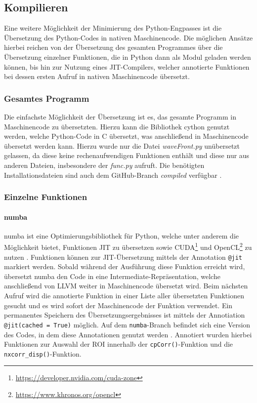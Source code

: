 \subsection{Kompilieren}

Eine weitere Möglichkeit der Minimierung des Python-Engpasses ist die Übersetzung des Python-Codes in nativen Maschinencode. Die möglichen Ansätze hierbei reichen von der Übersetzung des gesamten Programmes über die Übersetzung einzelner Funktionen, die in Python dann als Modul geladen werden können, bis hin zur Nutzung eines \gls{JIT}-Compilers, welcher annotierte Funktionen bei dessen ersten Aufruf in nativen Maschinencode übersetzt. 

\subsubsection{Gesamtes Programm}

Die einfachste Möglichkeit der Übersetzung ist es, das gesamte Programm in Maschinencode zu übersetzten. Hierzu kann die Bibliothek cython \cite{BBD+17} genutzt werden, welche Python-Code in C übersetzt, was anschließend in Maschinencode übersetzt werden kann. Hierzu wurde nur die Datei \textit{waveFront.py} unübersetzt gelassen, da diese keine rechenaufwendigen Funktionen enthält und diese nur aus anderen Dateien, insbesondere der \textit{func.py} aufruft. Die benötigten Installationsdateien sind auch dem GitHub-Branch \textit{compiled} verfügbar \cite{CBS18}. 

\subsubsection{Einzelne Funktionen}

\paragraph{numba}

numba ist eine Optimierungsbibliothek für Python, welche unter anderem die Möglichkeit bietet, Funktionen \gls{JIT} zu übersetzen sowie CUDA\footnote{\url{https://developer.nvidia.com/cuda-zone}} und OpenCL\footnote{\url{https://www.khronos.org/opencl}} zu nutzen \cite{LPS15}. Funktionen können zur \gls{JIT}-Übersetzung mittels der Annotation \texttt{@jit} markiert werden. Sobald während der Ausführung diese Funktion erreicht wird, übersetzt numba den Code in eine Intermediate-Repräsentation, welche anschließend von LLVM weiter in Maschinencode übersetzt wird. Beim nächsten Aufruf wird die annotierte Funktion in einer Liste aller übersetzten Funktionen gesucht und es wird sofort der Maschinencode der Funktion verwendet. Ein permanentes Speichern des Übersetzungsergebnisses ist mittels der Annotiation \texttt{@jit(cached = True)} möglich. Auf dem \texttt{numba}-Branch befindet sich eine Version des Codes, in dem diese Annotationen genutzt werden \cite{CBS18}. Annotiert wurden hierbei Funktionen zur Auswahl der \gls{ROI} innerhalb der \texttt{cpCorr()}-Funktion und die \texttt{nxcorr\_disp()}-Funktion.

